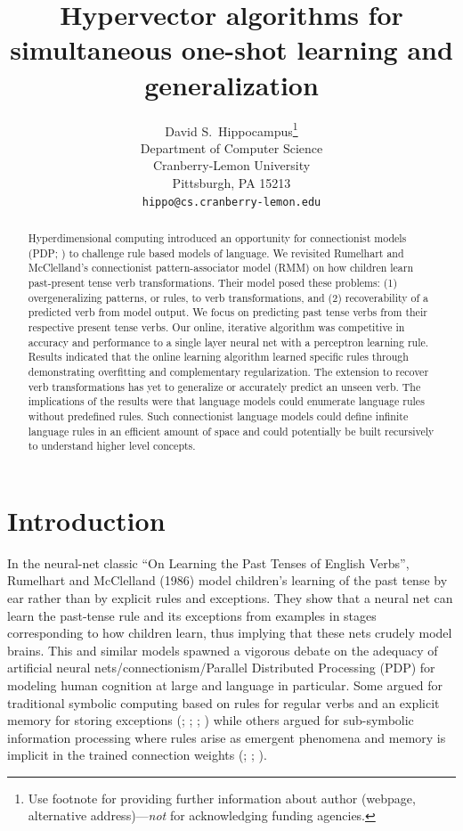 \documentclass{article}
\title{Hypervector algorithms for simultaneous one-shot learning and generalization}
\author{
  David S.~Hippocampus\thanks{Use footnote for providing further
    information about author (webpage, alternative
    address)---\emph{not} for acknowledging funding agencies.} \\
  Department of Computer Science\\
  Cranberry-Lemon University\\
  Pittsburgh, PA 15213 \\
  \texttt{hippo@cs.cranberry-lemon.edu} \\
}
\begin{document}

\maketitle

\begin{abstract}
Hyperdimensional computing introduced an opportunity for connectionist models (PDP; \citet{McClelland1986}) to challenge rule based models of language. 
We revisited Rumelhart and McClelland's connectionist pattern-associator model (RMM) on how children learn past-present tense verb transformations. Their model posed these problems: (1) overgeneralizing patterns, or rules, to verb transformations, and (2) recoverability of a predicted verb from model output.
We focus on predicting past tense verbs from their respective present tense verbs. Our online, iterative algorithm was competitive in accuracy and performance to a single layer neural net with a perceptron learning rule.
Results indicated that the online learning algorithm learned specific rules through demonstrating overfitting and complementary regularization. The extension to recover verb transformations has yet to generalize or accurately predict an unseen verb. 
The implications of the results were that language models could enumerate language rules without predefined rules. Such connectionist language models could define infinite language rules in an efficient amount of space and could potentially be built recursively to understand higher level concepts.

\end{abstract}

\section{Introduction}
In the neural-net classic ``On Learning the Past Tenses of English Verbs'', Rumelhart and McClelland (1986) model children's learning of the past tense by ear rather than by explicit rules and exceptions. They show that a neural net can learn the past-tense rule and its
exceptions from examples in stages corresponding to how children learn, thus implying that these nets crudely model brains. This and similar models spawned a vigorous debate on the adequacy of artificial neural nets/connectionism/Parallel Distributed Processing (PDP) for modeling human cognition at large and language in particular. Some argued for traditional symbolic computing based on rules for regular verbs and an explicit memory for storing exceptions (\citet{Pinker1988}; \citet{Fodor1988}; \citet{Fodor1990}; \citet{Pinker2002a}) while others argued for sub-symbolic information processing where rules arise as emergent phenomena and memory is implicit in the trained connection weights (\citet{MacWhinney1991}; \citet{Bullinaria1994}; \citet{McClelland2002}).
\end{document}
